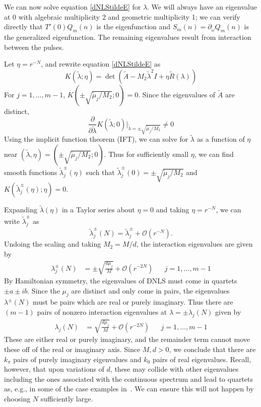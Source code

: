 \documentclass[12pt]{article}
\begin{document}
We can now solve equation \eqref{dNLStildeE} for $\lambda$. We will always have an eigenvalue at 0 with algebraic multiplicity 2 and geometric multiplicity 1; we can verify directly that $T'(0) Q_m(n)$ is the eigenfunction and $S_m(n) = \partial_\omega Q_m(n)$ is the generalized eigenfunction. The remaining eigenvalues result from interaction between the pulses. 

Let $\eta = r^{-N}$, and rewrite equation \eqref{dNLStildeE} as 
\begin{equation}\label{dNLStildeE2}
K(\tilde{\lambda}; \eta) = \det(\tilde{A} - M_2 \tilde{\lambda}^2 I + \eta \tilde{R}(\lambda))
\end{equation}
For $j = 1, \dots, m-1$, $K(\pm \sqrt{\tilde{\mu}_j / M_2 }; 0) = 0$. Since the eigenvalues of $\tilde{A}$ are distinct, 
\[
\frac{\partial}{\partial \tilde{\lambda}} K(\tilde{\lambda}; 0)\Big|_{\tilde{\lambda} = \pm \sqrt{\tilde{\mu}_j / M_2 }} \neq 0
\]
Using the implicit function theorem (IFT), we can solve for $\tilde{\lambda}$ as a function of $\eta$ near $(\tilde{\lambda}, \eta) = (\pm \sqrt{\tilde{\mu}_j / M_2 }; 0)$. Thus for sufficiently small $\eta$, we can find smooth functions $\tilde{\lambda}_j^\pm(\eta)$ such that $\tilde{\lambda}_j^\pm(0) = \pm \sqrt{\tilde{\mu}_j / M_2 }$ and $K(\tilde{\lambda}_j^\pm(\eta); \eta) = 0$. 

Expanding $\tilde{\lambda}(\eta)$ in a Taylor series about $\eta = 0$ and taking $\eta = r^{-N}$, we can write $\tilde{\lambda}_j^\pm$ as
\begin{equation*}
\tilde{\lambda}_j^\pm(N) = \tilde{\lambda}_j^\pm + \mathcal{O}(r^{-N}).
\end{equation*}
Undoing the scaling and taking $M_2 = M/d$, the interaction eigenvalues are given by
\begin{align*}
\lambda^\pm_j(N) &= \pm \sqrt{\frac{d \mu_j}{M}} + \mathcal{O}(r^{-2N}) && j = 1, \dots, m-1 
\end{align*}
By Hamiltonian symmetry, the eigenvalues of DNLS must come in quartets $\pm a \pm i b$. Since the $\mu_j$ are distinct and only come in pairs, the eigenvalues $\lambda^\pm(N)$ must be pairs which are real or purely imaginary. Thus there are $(m - 1)$ pairs of nonzero interaction eigenvalues at $\lambda = \pm \lambda_j(N)$ given by 
\begin{align*}
\lambda_j(N) &= \sqrt{\frac{d \mu_j}{M}} + \mathcal{O}(r^{-2N}) && j = 1, \dots, m-1
\end{align*}
These are either real or purely imaginary, and the remainder term cannot move these off of the real or imaginary axis. Since $M, d > 0$, we conclude that there are $k_\pi$ pairs of purely imaginary eigenvalues and $k_0$ pairs of real eigenvalues.
Recall, however, that upon variations of $d$,
these may collide with other eigenvalues including
the ones associated with the continuous spectrum
and lead to quartets as, e.g., in some of the
case examples in~\cite{Pelinovsky2005}. We can ensure this will not happen by choosing $N$ sufficiently large.
\end{document}
